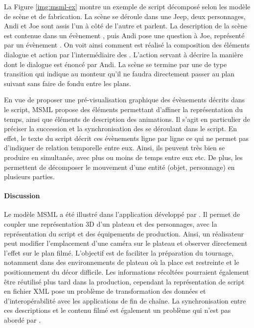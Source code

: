 La Figure \ref{img:msml-ex} montre un exemple de script décomposé selon les modèle de scène et de fabrication. 
La scène se déroule dans une Jeep, deux personnages, Andi et Joe sont assis l'un à côté de l'autre et parlent. 
La description de la scène est contenue dans un évènement , puis Andi pose une question à Joe, représenté par un évènement . 
On voit ainsi comment est réalisé la composition des éléments dialogue et action par l'intermédiaire des .
L'action servant à décrire la manière dont le dialogue est énoncé par Andi.
La scène se termine par une  de type transition qui indique au monteur qu'il ne faudra directement passer au plan suivant sans faire de fondu entre les plans.



En vue de proposer une pré-visualisation graphique des évènements décrits dans le script, MSML propose des éléments permettant d'affiner la représentation du temps, ainsi que éléments de description des animations.
Il s'agit en particulier de préciser la succession et la synchronisation des  se déroulant dans le script. 
En effet, le texte du script décrit ces évènements ligne par ligne ce qui ne permet pas d'indiquer de relation temporelle entre eux.
Ainsi, ils peuvent très bien se produire en simultanée, avec plus ou moins de temps entre eux etc.
De plus, les  permettent de décomposer le mouvement d'une entité (objet, personnage) en plusieurs parties.

\paragraph{Discussion}
Le modèle MSML a été illustré dans l'application  développé par \cite{Cardinaels2008}. 
Il permet de coupler une représentation 3D d'un plateau et des personnages, avec la représentation du script et des équipements de production.
Ainsi, un réalisateur peut modifier l'emplacement d'une caméra sur le plateau et observer directement l'effet sur le plan filmé. 
L'objectif est de faciliter la préparation du tournage, notamment dans des environnements de plateau où la place est restreinte et le positionnement du décor difficile.
Les informations récoltées pourraient également être réutilisé plus tard dans la production, cependant la représentation de script en fichier XML pose un problème de transformation des données et d'interopérabilité avec les applications de fin de chaîne.
La synchronisation entre ces descriptions et le contenu filmé est également un problème qui n'est pas abordé par \cite{VanRijsselbergen2009}. 

